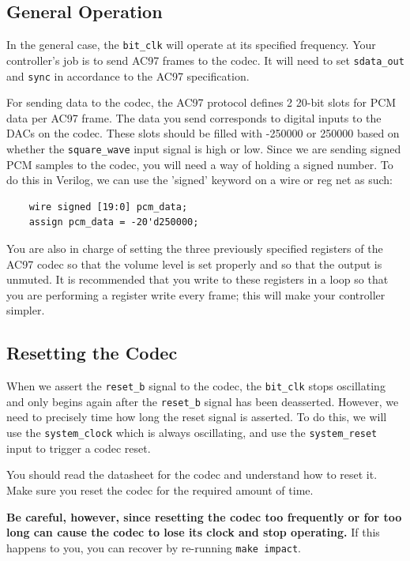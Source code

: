 \documentclass[11pt]{article}
\begin{document}
\subsection{General Operation}

In the general case, the \verb|bit_clk| will operate at its specified frequency. Your controller's job is to send AC97 frames to the codec. It will need to set \verb|sdata_out| and \verb|sync| in accordance to the AC97 specification.

For sending data to the codec, the AC97 protocol defines 2 20-bit slots for PCM data per AC97 frame. The data you send corresponds to digital inputs to the DACs on the codec. These slots should be filled with -250000 or 250000 based on whether the \verb|square_wave| input signal is high or low. Since we are sending signed PCM samples to the codec, you will need a way of holding a signed number. To do this in Verilog, we can use the 'signed' keyword on a wire or reg net as such:

\begin{verbatim}
	wire signed [19:0] pcm_data;
	assign pcm_data = -20'd250000;
\end{verbatim}

You are also in charge of setting the three previously specified registers of the AC97 codec so that the volume level is set properly and so that the output is unmuted. It is recommended that you write to these registers in a loop so that you are performing a register write every frame; this will make your controller simpler.

\subsection{Resetting the Codec}
When we assert the \verb|reset_b| signal to the codec, the \verb|bit_clk| stops oscillating and only begins again after the \verb|reset_b| signal has been deasserted. However, we need to precisely time how long the reset signal is asserted. To do this, we will use the \verb|system_clock| which is always oscillating, and use the \verb|system_reset| input to trigger a codec reset.

You should read the datasheet for the codec and understand how to reset it. Make sure you reset the codec for the required amount of time. 

\textbf{Be careful, however, since resetting the codec too frequently or for too long can cause the codec to lose its clock and stop operating.} If this happens to you, you can recover by re-running \verb|make impact|.
\end{document}
